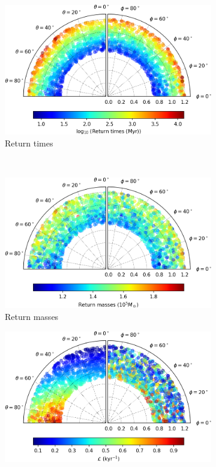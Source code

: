 \begin{figure}[h]
    \centering
    \begin{subfigure}[t]{0.4\textwidth}
        \includegraphics[width = \textwidth]{"../Files/Week 13/images/27_time"}
        \caption{Return times}
    \end{subfigure}
    ~ 
    \begin{subfigure}[t]{0.4\textwidth}
        \includegraphics[width=\textwidth]{"../Files/Week 13/images/27_mass"}
        \caption{Return masses}
    \end{subfigure}
    \begin{subfigure}[t]{0.4\textwidth}
        \includegraphics[width=\textwidth]{"../Files/Week 13/images/27_lyapunov"}

\end{subfigure}
\end{figure}
